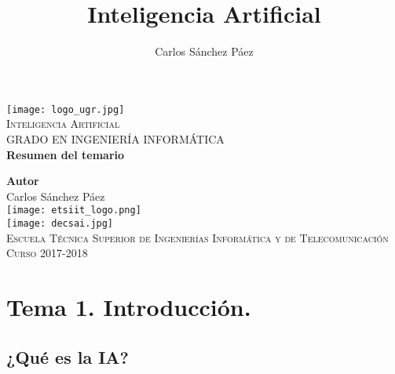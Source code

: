 \documentclass[12pt,spanish]{article}
\title{Inteligencia Artificial}
\author{Carlos Sánchez Páez}
\numberwithin{definition}{subsection}
\begin{document}
\begin{titlepage}

\newlength{\centeroffset}
\setlength{\centeroffset}{-0.5\oddsidemargin}
\addtolength{\centeroffset}{0.5\evensidemargin}
\thispagestyle{empty}

\noindent\hspace*{\centeroffset}
\begin{minipage}{\textwidth}

\centering
\texttt{[image: logo\_ugr.jpg]}\\[1.4cm]

\textsc{ \Large Inteligencia Artificial\\[0.2cm]}
\textsc{GRADO EN INGENIERÍA INFORMÁTICA}\\[1cm]

{\Huge\bfseries Resumen del temario\\}
\end{minipage}

\vspace{1.5cm}
\noindent\hspace*{\centeroffset}
\begin{minipage}{\textwidth}
\centering

\textbf{Autor}\\ {Carlos Sánchez Páez}\\[2.5ex]
\texttt{[image: etsiit\_logo.png]}\\[0.1cm]
\vspace{1.5cm}
\texttt{[image: decsai.jpg]}\\[0.1cm]
\vspace{1cm}
\textsc{Escuela Técnica Superior de Ingenierías Informática y de Telecomunicación}\\
\vspace{1cm}
\textsc{Curso 2017-2018}
\end{minipage}
\end{titlepage}
\thispagestyle{empty}
\newpage
\tableofcontents{}
\newpage
\listoffigures
\thispagestyle{empty}
\newpage

\section{Tema 1. Introducción.}

\subsection{¿Qué es la IA?}
\end{document}
